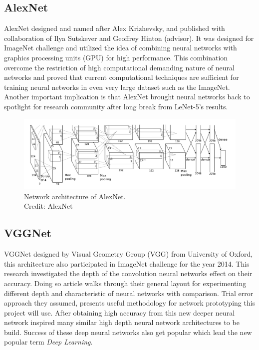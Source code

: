 \documentclass[12pt, twoside, a4paper]{article}
\begin{document}
\subsection{AlexNet}
AlexNet \cite{Alexnet} designed and named after Alex Krizhevsky, and published with collaboration of Ilya Sutskever and Geoffrey Hinton (advisor). It was designed for ImageNet challenge \cite{imagenet} and utilized the idea of combining neural networks with graphics processing units (GPU) for high performance. This combination overcome the restriction of high computational demanding nature of neural networks and proved that current computational techniques are sufficient for training neural networks in even very large dataset such as the ImageNet. Another important implication is that AlexNet brought neural networks back to spotlight for research community after long break from LeNet-5's results. 

\begin{figure}[H]%
    \centering
    \includegraphics[width=\textwidth]{img/alexnet.png}%
    \caption{Network architecture of AlexNet.\\Credit: AlexNet \cite{Alexnet}}%
    \label{fig:alexnet}%
\end{figure}

\subsection{VGGNet}
VGGNet \cite{vggnet} designed by Visual Geometry Group (VGG) from University of Oxford, this architecture also participated in ImageNet challenge \cite{imagenet} for the year 2014. This research investigated the depth of the convolution neural networks effect on their accuracy. Doing so article walks through their general layout for experimenting different depth and characteristic of neural networks with comparison. Trial error approach they assumed, presents useful methodology for network prototyping this project will use. After obtaining high accuracy from this new deeper neural network inspired many similar high depth neural network architectures to be build. Success of these deep neural networks also get popular which lead the new popular term \textit{Deep Learning}.
\end{document}

